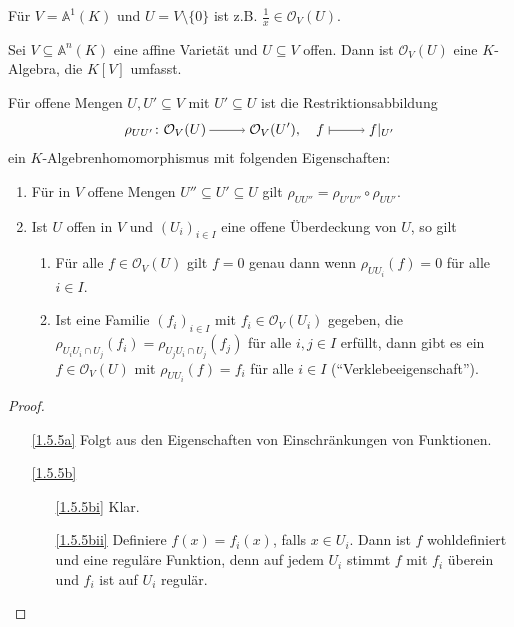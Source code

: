 \documentclass[a4paper,12pt]{scrbook}
\newtheorem{proof}{Beweis}
\def\A{\mathbb{A}}
\def\O{\mathcal{O}}
\newcommand{\restrict}[1]{|_{#1}}
\newcommand{\ra}{\raisebox{-1pt}{\tikz{\draw[thin,shorten >=3pt, ->] (0,0) node{\hspace*{-2pt}} -- node{} (1,0);}}\penalty1000\relax}
\renewcommand{\mapsto}{\raisebox{-1pt}{\tikz{\draw[thin,shorten >=3pt, |->] (0,0) node{\hspace*{0pt}} -- node{} (1,0);}}\penalty1000\relax}
\begin{document}
\begin{nbsp}
  Für $V=\A^1(K)$ und $U=V\setminus\{0\}$ ist z.B. $\frac1x\in\O_V(U)$.
\end{nbsp}

\begin{bem}\label{1.5.4}
  Sei $V\subseteq\A^n(K)$ eine affine Varietät und $U\subseteq V$ offen. Dann ist $\O_V(U)$ eine $K$-Algebra, die $K[V]$
  umfasst.
\end{bem}

\begin{bem}\label{1.5.5}
  Für offene Mengen $U,U'\subseteq V$ mit $U'\subseteq U$ ist die Restriktionsabbildung
  \[ \rho_{UU'}\colon \O_V(U)\ra\O_V(U'),\quad f\mapsto f\restrict{U'} \]
  ein $K$-Algebrenhomomorphismus mit folgenden Eigenschaften:
  \begin{enumerate}
  \item{} Für in $V$ offene Mengen $U''\subseteq U'\subseteq U$ gilt $\rho_{UU''}=\rho_{U'U''}\circ\rho_{UU'}$.
  \item{} Ist $U$ offen in $V$ und $(U_i)_{i\in I}$ eine offene Überdeckung von $U$, so gilt
    \begin{enumerate}
    \item{} Für alle $f\in\O_V(U)$ gilt $f=0$ genau dann wenn $\rho_{UU_i}(f)=0$ für alle $i\in I$.
    \item{} Ist eine Familie $(f_i)_{i\in I}$ mit $f_i\in\O_V(U_i)$ gegeben, die $\rho_{U_iU_i\cap
        U_j}(f_i)=\rho_{U_jU_i\cap U_j}(f_j)$  für alle $i,j\in I$ erfüllt, dann gibt es ein $f\in\O_V(U)$ mit
      $\rho_{UU_i}(f)=f_i$ für alle $i\in I$
      (\enquote{Verklebeeigenschaft}).
    \end{enumerate}
  \end{enumerate}
\end{bem}
\begin{proof}
  \begin{enumerate}
  \item[\ref{1.5.5a}] Folgt aus den Eigenschaften von Einschränkungen von Funktionen.
  \item[\ref{1.5.5b}]
    \begin{enumerate}
    \item[\ref{1.5.5bi}] Klar.
    \item[\ref{1.5.5bii}] Definiere $f(x)=f_i(x)$, falls $x\in U_i$. Dann ist $f$ wohldefiniert und eine reguläre Funktion, denn
      auf jedem $U_i$  stimmt $f$ mit $f_i$ überein und $f_i$ ist auf $U_i$ regulär.
    \end{enumerate}
  \end{enumerate}
\end{proof}
\end{document}

